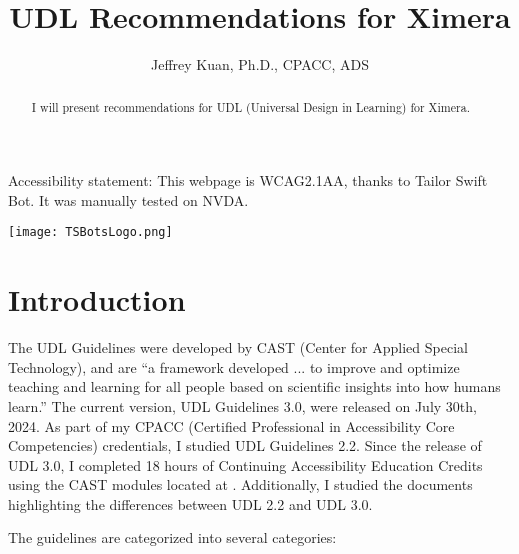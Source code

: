 \documentclass{ximera}
\author{Jeffrey Kuan, Ph.D., CPACC, ADS}
\title{UDL Recommendations for Ximera}
\begin{document}
 
\begin{abstract}
   I will present recommendations for UDL (Universal Design in Learning) for Ximera.
\end{abstract}
\maketitle
 
 
Accessibility statement: This webpage is WCAG2.1AA, thanks to Tailor Swift Bot. It was manually
tested on NVDA. 
 
\texttt{[image: TSBotsLogo.png]}
 
\section{Introduction}

The UDL Guidelines were developed by CAST \cite{CAST} (Center for Applied Special Technology), and are 
 ``a framework developed ... to improve and optimize teaching and learning for all people based on scientific insights into how humans learn.''
The current version, UDL Guidelines 3.0, were released on July 30th, 2024. As part of my CPACC (Certified Professional in Accessibility Core Competencies) 
credentials, I studied UDL Guidelines 2.2. Since the release of UDL 3.0, I completed 18 hours of Continuing Accessibility Education Credits using the
CAST modules located at \cite{NCAEM}. Additionally, I studied the documents highlighting the differences between UDL 2.2 and UDL 3.0.

The guidelines are categorized into several categories:
\end{document}
